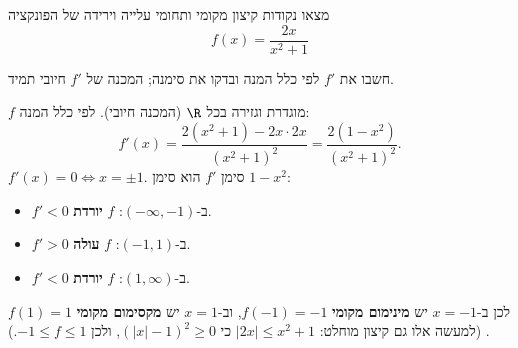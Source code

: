 
\begin{question}
מצאו נקודות קיצון מקומי ותחומי עלייה וירידה של הפונקציה
\[ f(x)=\frac{2x}{x^2+1} \]
\end{question}

\begin{hint}
חשבו את $f'$ לפי כלל המנה ובדקו את סימנה; המכנה של $f'$ חיובי תמיד.
\end{hint}

\begin{solution}
$f$ מוגדרת וגזירה בכל $\R$ (המכנה חיובי). לפי כלל המנה:
\[ f'(x)=\frac{2(x^2+1)-2x\cdot2x}{(x^2+1)^2}=\frac{2(1-x^2)}{(x^2+1)^2}. \]
$f'(x)=0\iff x=\pm1$. סימן $f'$ הוא סימן $1-x^2$:
\begin{itemize}
  \item $f'<0$ ב-$(-\infty,-1)$: $f$ \textbf{יורדת}.
  \item $f'>0$ ב-$(-1,1)$: $f$ \textbf{עולה}.
  \item $f'<0$ ב-$(1,\infty)$: $f$ \textbf{יורדת}.
\end{itemize}
לכן ב-$x=-1$ יש \textbf{מינימום מקומי} $f(-1)=-1$, וב-$x=1$ יש \textbf{מקסימום מקומי} $f(1)=1$.
(למעשה אלו גם קיצון מוחלט: $|2x|\le x^2+1$ כי $(|x|-1)^2\ge0$, ולכן $-1\le f\le 1$.)
\end{solution}
